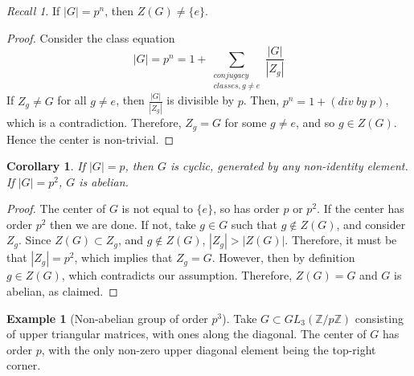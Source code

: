 \documentclass[12pt]{article}
\newtheorem{cor}[thm]{Corollary}
\theoremstyle{definition}
\newtheorem{eg}[thm]{Example}
\theoremstyle{remark}
\newtheorem*{rec}{Recall}
\numberwithin{equation}{section}
\newcommand\Z{\mathbb Z}    %
\begin{document}
\vspace{15pt}


\begin{rec}
        If $|G| = p^n$, then $Z(G) \neq \{e\}$.
\end{rec}
\begin{proof}
        Consider the class equation \begin{equation}
                |G| = p^n = 1 + \sum\limits_{\begin{array}{c} conjugacy\\classes, g\neq e\end{array}}\frac{|G|}{|Z_g|}
        \end{equation}
        If $Z_g \neq G$ for all $g \neq e$, then $\frac{|G|}{|Z_g|}$ is divisible by $p$. Then, $p^n = 1 + (div\;by\;p)$, which is a contradiction. Therefore, $Z_g = G$ for some $g \neq e$, and so $g \in Z(G)$. Hence the center is non-trivial.
\end{proof}

\vspace{15pt}

\begin{cor}
        If $|G| = p$, then $G$ is cyclic, generated by any non-identity element. If $|G| = p^2$, $G$ is abelian.
\end{cor}
\begin{proof}
        The center of $G$ is not equal to $\{e\}$, so has order $p$ or $p^2$. If the center has order $p^2$ then we are done. If not, take $g \in G$ such that $g \notin Z(G)$, and consider $Z_g$. Since $Z(G) \subset Z_g$, and $g \notin Z(G)$, $|Z_g| > |Z(G)|$. Therefore, it must be that $|Z_g| = p^2$, which implies that $Z_g = G$. However, then by definition $g \in Z(G)$, which contradicts our assumption. Therefore, $Z(G) = G$ and $G$ is abelian, as claimed.
\end{proof}

\vspace{15pt}

\begin{eg}[Non-abelian group of order $p^3$]
        Take $G \subset GL_3(\Z/p\Z)$ consisting of upper triangular matrices, with ones along the diagonal. The center of $G$ has order $p$, with the only non-zero upper diagonal element being the top-right corner.
\end{eg}




\vspace{15pt}
\end{document}
